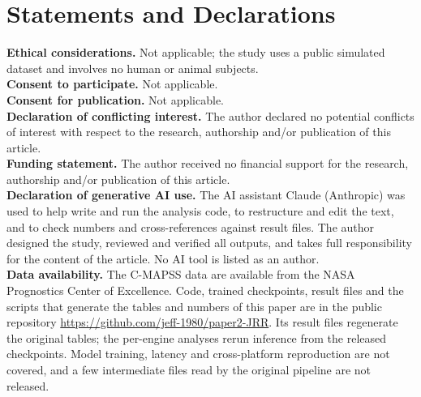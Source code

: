\documentclass[11pt,a4paper]{article}
\newif\ifanon
\begin{document}
\section*{Statements and Declarations}
\noindent\textbf{Ethical considerations.} Not applicable; the study uses a public simulated dataset and involves no human or animal subjects.\\[2pt]
\noindent\textbf{Consent to participate.} Not applicable.\\[2pt]
\noindent\textbf{Consent for publication.} Not applicable.\\[2pt]
\noindent\textbf{Declaration of conflicting interest.} The author declared no potential conflicts of interest with respect to the research, authorship and/or publication of this article.\\[2pt]
\noindent\textbf{Funding statement.} The author received no financial support for the research, authorship and/or publication of this article.\\[2pt]
\noindent\textbf{Declaration of generative AI use.} The AI assistant Claude (Anthropic) was used to help write and run the analysis code, to restructure and edit the text, and to check numbers and cross-references against result files. The author designed the study, reviewed and verified all outputs, and takes full responsibility for the content of the article. No AI tool is listed as an author.\\[2pt]
\noindent\textbf{Data availability.} The C-MAPSS data are available from the NASA Prognostics Center of Excellence. Code, trained checkpoints, result files and the scripts that generate the tables and numbers of this paper are in the public repository \ifanon given to the editor\else\url{https://github.com/jeff-1980/paper2-JRR}\fi. Its result files regenerate the original tables; the per-engine analyses rerun inference from the released checkpoints. Model training, latency and cross-platform reproduction are not covered, and a few intermediate files read by the original pipeline are not released.
\end{document}
